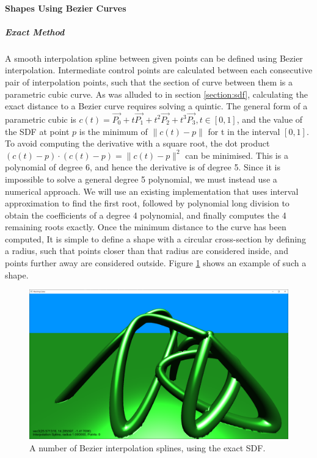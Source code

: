 \documentclass{article}
\begin{document}
\paragraph{Shapes Using Bezier Curves}
\subparagraph{Exact Method}
A smooth interpolation spline between given points can be defined using Bezier interpolation. Intermediate control points are calculated between each consecutive pair of interpolation points, such that the section of curve between them is a parametric cubic curve. As was alluded to in section \ref{section:sdf}, calculating the exact distance to a Bezier curve requires solving a quintic. The general form of a parametric cubic is $c\left(t\right) = \vec{P_0} + t\vec{P_1} + t^2\vec{P_2} + t^3\vec{P_3}, t \in \left[0,1\right]$, and the value of the SDF at point $p$ is the minimum of $\| c\left(t\right) -p\|$ for t in the interval $\left[0,1\right]$. To avoid computing the derivative with a square root, the dot product $\left(c\left(t\right) -p\right) \cdot \left(c\left(t\right) -p\right) = \| c\left(t\right) -p\|^2$ can be minimised. This is a polynomial of degree 6, and hence the derivative is of degree 5. Since it is impossible to solve a general degree 5 polynomial, we must instead use a numerical approach. We will use an existing implementation\cite{kraus_2021} that uses interval approximation to find the first root, followed by polynomial long division to obtain the coefficients of a degree 4 polynomial, and finally computes the 4 remaining roots exactly. Once the minimum distance to the curve has been computed, It is simple to define a shape with a circular cross-section by defining a radius, such that points closer than that radius are considered inside, and points further away are considered outside. Figure \ref{fig:exact_bezier} shows an example of such a shape.

\begin{figure}[H]
  \includegraphics[width=\textwidth]{exact_bezier}
  \caption{A number of Bezier interpolation splines, using the exact SDF.}
  \label{fig:exact_bezier}
\end{figure}
\end{document}
